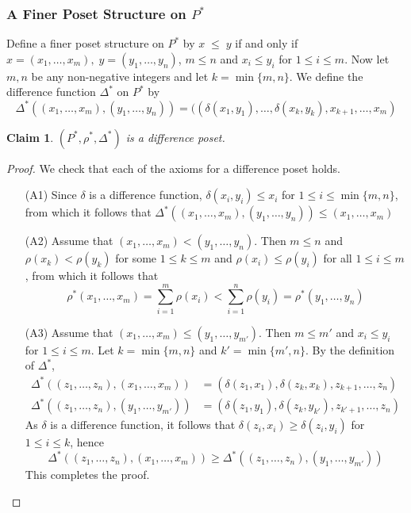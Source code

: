 \documentclass[acmsmall,review,anonymous]{acmart}\settopmatter{printfolios=true,printccs=false,printacmref=false}
\newtheorem{claim}{Claim}
\begin{document}
\subsubsection{A Finer Poset Structure on $P^*$}
Define a finer poset structure on $P^*$ by $x \; \leq \; y$
if and only if $x = (x_1, \ldots, x_m), \; y = (y_1, \ldots, y_n)$, $m \leq n$
and $x_i \leq y_i$ for $1 \leq i \leq m$. Now let $m, n$ be any non-negative
integers and let $k = \min\{m, n\}$. We define the difference function
$\Delta^*$ on $P^*$ by 
$$\Delta^*((x_1, \ldots, x_m), (y_1, \ldots, y_n)) = ((\delta(x_1, y_1), \ldots,
\delta(x_k, y_k), x_{k+1}, \ldots, x_m)$$
\begin{claim}
$(P^*, \rho^*, \Delta^*)$ is a difference poset.
\end{claim}
\begin{proof}
We check that each of the axioms for a difference poset holds.
\begin{enumerate}
  \item[(A1)]
  Since $\delta$ is a difference function, $\delta(x_i, y_i)
  \leq x_i$ for $1 \leq i \leq \min\{m, n\}$, from which it follows that
  $\Delta^*((x_1, \ldots, x_m), (y_1, \ldots, y_n)) \leq (x_1, \ldots, x_m)$
  \item[(A2)]
  Assume that $(x_1, \ldots, x_m) < (y_1, \ldots, y_n)$. Then $m \leq
  n$ and $\rho(x_k) < \rho(y_k)$ for some $1 \leq k \leq m$ and $\rho(x_i)
  \leq \rho(y_i)$ for all $1 \leq i \leq m$, from which it follows that
  $$\rho^*(x_1, \ldots, x_m) = \sum_{i=1}^m \rho(x_i) < \sum_{i=1}^{n}\rho(y_i)
  = \rho^*(y_1, \ldots, y_n)$$
  \item[(A3)]
  Assume that $(x_1, \ldots, x_m) \leq (y_1, \ldots, y_{m'})$. Then $m \leq
  m'$ and $x_i \leq y_i$ for $1 \leq i \leq m$. Let $k = \min\{m, n\}$ and $k' =
  \min\{m', n\}$. By the definition of $\Delta^*$,
  \begin{align*}
\Delta^*((z_1, \ldots, z_n), (x_1, \ldots, x_m)) &= (\delta(z_1, x_1),
\delta(z_k, x_k), z_{k+1}, \ldots, z_n)\\
\Delta^*((z_1, \ldots, z_n), (y_1, \ldots, y_{m'})) &= (\delta(z_1, y_1),
\delta(z_k, y_{k'}), z_{k'+1}, \ldots, z_n)
\end{align*}
As $\delta$ is a difference function, it follows that $\delta(z_i, x_i) \geq
\delta(z_i, y_i)$ for $1 \leq i \leq k$, hence
$$\Delta^*((z_1, \ldots, z_n), (x_1, \ldots, x_m)) \geq \Delta^*((z_1,
\ldots, z_n), (y_1, \ldots, y_{m'}))$$
This completes the proof.
\end{enumerate}
\end{proof}
\end{document}

